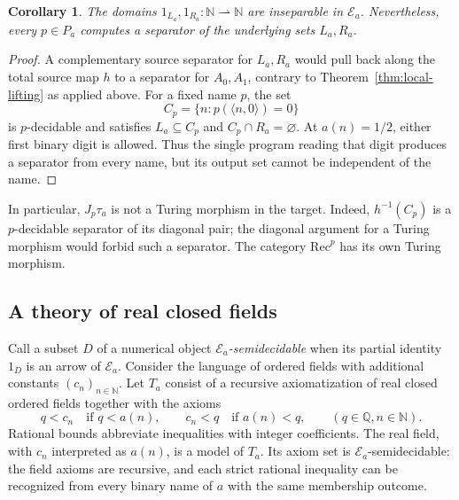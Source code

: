 \documentclass[11pt]{article}
\newtheorem{corollary}[theorem]{Corollary}
\newcommand{\N}{\mathbb N}
\begin{document}
\begin{corollary}\label{cor:miller-cuts-inseparable}
The domains $1_{L_a},1_{R_a}:\N\rightharpoonup\N$ are inseparable in
$\mathcal E_a$. Nevertheless, every $p\in P_a$ computes a separator
of the underlying sets $L_a,R_a$.
\end{corollary}
\begin{proof}
A complementary source separator for $L_a,R_a$ would pull back along
the total source map $h$ to a separator for $A_0,A_1$, contrary to
Theorem~\ref{thm:local-lifting} as applied above.
For a fixed name $p$, the set
\[
 C_p=\{n:p(\langle n,0\rangle)=0\}
\]
is $p$-decidable and satisfies $L_a\subseteq C_p$ and
$C_p\cap R_a=\varnothing$. At $a(n)=1/2$, either first binary digit
is allowed. Thus the single program reading that digit produces a
separator from every name, but its output set cannot be independent
of the name.
\end{proof}

In particular, $J_p\tau_a$ is not a Turing morphism in the target.
Indeed, $h^{-1}(C_p)$ is a $p$-decidable separator of its diagonal pair;
the diagonal argument for a Turing morphism would forbid such a
separator. The category $\mathrm{Rec}^{p}$ has its own Turing morphism.


\subsection{A theory of real closed fields}

Call a subset $D$ of a numerical object \emph{$\mathcal E_a$-semidecidable}
when its partial identity $1_D$ is an arrow of $\mathcal E_a$.
Consider the language of ordered fields with additional constants
$(c_n)_{n\in\N}$. Let $T_a$ consist of a recursive axiomatization of
real closed ordered fields together with the axioms
\begin{equation}\label{eq:miller-theory}
 q<c_n\quad\text{if }q<a(n),\qquad
 c_n<q\quad\text{if }a(n)<q,
 \qquad(q\in\mathbb Q, n\in\N).
\end{equation}
Rational bounds abbreviate inequalities with integer coefficients.
The real field, with $c_n$ interpreted as $a(n)$, is a model of $T_a$.
Its axiom set is $\mathcal E_a$-semidecidable: the field axioms are
recursive, and each strict rational inequality can be recognized from
every binary name of $a$ with the same membership outcome.
\end{document}
